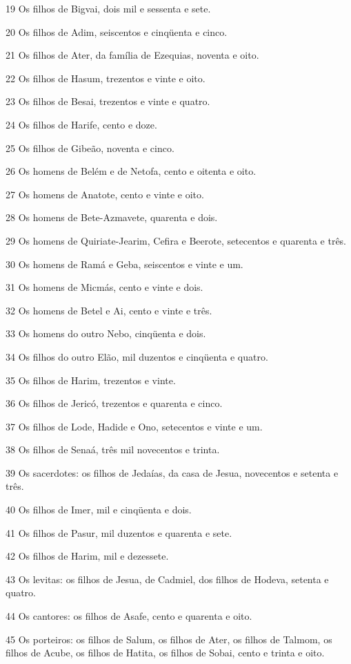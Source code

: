 \par 19 Os filhos de Bigvai, dois mil e sessenta e sete.
\par 20 Os filhos de Adim, seiscentos e cinqüenta e cinco.
\par 21 Os filhos de Ater, da família de Ezequias, noventa e oito.
\par 22 Os filhos de Hasum, trezentos e vinte e oito.
\par 23 Os filhos de Besai, trezentos e vinte e quatro.
\par 24 Os filhos de Harife, cento e doze.
\par 25 Os filhos de Gibeão, noventa e cinco.
\par 26 Os homens de Belém e de Netofa, cento e oitenta e oito.
\par 27 Os homens de Anatote, cento e vinte e oito.
\par 28 Os homens de Bete-Azmavete, quarenta e dois.
\par 29 Os homens de Quiriate-Jearim, Cefira e Beerote, setecentos e quarenta e três.
\par 30 Os homens de Ramá e Geba, seiscentos e vinte e um.
\par 31 Os homens de Micmás, cento e vinte e dois.
\par 32 Os homens de Betel e Ai, cento e vinte e três.
\par 33 Os homens do outro Nebo, cinqüenta e dois.
\par 34 Os filhos do outro Elão, mil duzentos e cinqüenta e quatro.
\par 35 Os filhos de Harim, trezentos e vinte.
\par 36 Os filhos de Jericó, trezentos e quarenta e cinco.
\par 37 Os filhos de Lode, Hadide e Ono, setecentos e vinte e um.
\par 38 Os filhos de Senaá, três mil novecentos e trinta.
\par 39 Os sacerdotes: os filhos de Jedaías, da casa de Jesua, novecentos e setenta e três.
\par 40 Os filhos de Imer, mil e cinqüenta e dois.
\par 41 Os filhos de Pasur, mil duzentos e quarenta e sete.
\par 42 Os filhos de Harim, mil e dezessete.
\par 43 Os levitas: os filhos de Jesua, de Cadmiel, dos filhos de Hodeva, setenta e quatro.
\par 44 Os cantores: os filhos de Asafe, cento e quarenta e oito.
\par 45 Os porteiros: os filhos de Salum, os filhos de Ater, os filhos de Talmom, os filhos de Acube, os filhos de Hatita, os filhos de Sobai, cento e trinta e oito.
